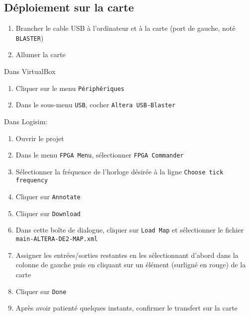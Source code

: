 \subsection{Déploiement sur la carte}
\begin{enumerate}
        \item Brancher le cable USB à l'ordinateur et à la carte (port de gauche, noté \texttt{BLASTER})
        \item Allumer la carte
\end{enumerate}

\vspace{0.2em}
\noindent Dans VirtualBox
\vspace{0.2em}
\begin{enumerate}
        \item Cliquer sur le menu \texttt{Périphériques}
        \item Dans le sous-menu \texttt{USB}, cocher \texttt{Altera USB-Blaster}
\end{enumerate} 

\noindent Dans Logisim:
\begin{enumerate}
	\item Ouvrir le projet
	\item Dans le menu \texttt{FPGA Menu}, sélectionner \texttt{FPGA Commander}
	\item Sélectionner la fréquence de l'horloge désirée à la ligne \texttt{Choose tick frequency}
	\item Cliquer sur \texttt{Annotate}
	\item Cliquer sur \texttt{Download}
	\item Dans cette boîte de dialogue, cliquer sur \texttt{Load Map} et sélectionner le fichier \texttt{main-ALTERA-DE2-MAP.xml}
	\item Assigner les entrées/sorties restantes en les sélectionnant d'abord dans la colonne de gauche puis en cliquant sur un élément (surligné en rouge) de la carte
	\item Cliquer sur \texttt{Done}
	\item Après avoir patienté quelques instants, confirmer le transfert sur la carte
\end{enumerate}
